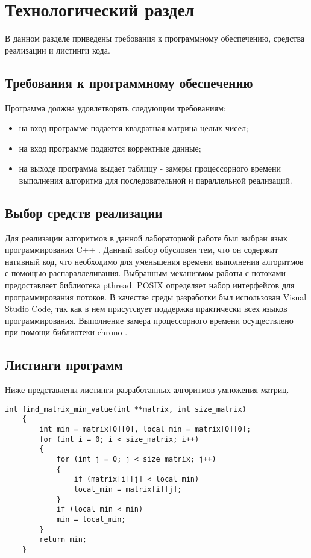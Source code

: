 \chapter{Технологический раздел}
В данном разделе приведены требования к программному обеспечению, средства реализации и листинги кода.

\section{Требования к программному обеспечению}
Программа должна удовлетворять следующим требованиям:
\begin{itemize}
	\item на вход программе подается квадратная матрица целых чисел;
	\item на вход программе подаются корректные данные;
	\item на выходе программа выдает таблицу - замеры процессорного времени выполнения алгоритма для последовательной и параллельной реализаций.
\end{itemize}


\section{Выбор средств реализации}
Для реализации алгоритмов в данной лабораторной работе был выбран язык программирования C++ \cite{c++}. Данный выбор обусловен тем, что он содержит нативный код, что необходимо для уменьшения времени выполнения алгоритмов с помощью распараллеливания. Выбранным механизмом работы с потоками предоставляет библиотека pthread\cite{pthreads}. POSIX определяет набор интерфейсов для программирования потоков. В качестве среды разработки был использован Visual Studio Code\cite{vs}, так как в нем присутсвует поддержка практически всех языков программирования. Выполнение замера процессорного времени осуществлено при помощи библиотеки chrono \cite{chrono}.

\section{Листинги программ}
Ниже представлены листинги разработанных алгоритмов умножения матриц.
\newpage
\begin{lstlisting}[label = ordinary_min, caption=Программный код алгоритма нахождения минимума в матрице (последовательная реализация).]
	int find_matrix_min_value(int **matrix, int size_matrix)
	{
		int min = matrix[0][0], local_min = matrix[0][0];
		for (int i = 0; i < size_matrix; i++)
		{
			for (int j = 0; j < size_matrix; j++)
			{
				if (matrix[i][j] < local_min)
				local_min = matrix[i][j];
			}
			if (local_min < min)
			min = local_min;
		}
		return min;
	}
\end{lstlisting}

